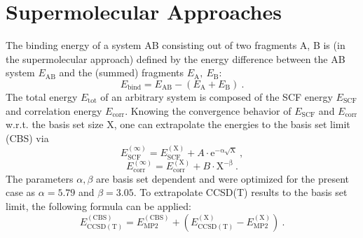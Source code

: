 \documentclass[a4paper,12pt]{scrartcl}
\begin{document}
\section{Supermolecular Approaches}
%
The binding energy  of a system AB consisting out of two fragments A, B is (in the supermolecular approach) defined by the energy difference between the AB system $ E_\mathrm{AB} $ and the (summed) fragments $ E_\mathrm{A},~E_\mathrm{B} $:
%
\begin{equation}
	E_\mathrm{bind} = E_\mathrm{AB} - ( E_\mathrm{A} + E_\mathrm{B} )~.
\end{equation}
%
The total energy $ E_\mathrm{tot} $ of an arbitrary system is composed of the SCF energy $ E_\mathrm{SCF} $ and correlation energy $ E_\mathrm{corr} $. Knowing the convergence behavior of $ E_\mathrm{SCF} $ and $ E_\mathrm{corr} $ w.r.t. the basis set size X, one can extrapolate the energies to the basis set limit (CBS) via
%
\begin{equation}
	E_\mathrm{SCF}^{(\infty)} = E_\mathrm{SCF}^{(\mathrm{X})} + A \cdot \mathrm{e^{-\alpha\sqrt{X}}}~,
\end{equation}
%
\begin{equation}
	E_\mathrm{corr}^{(\infty)} = E_\mathrm{corr}^{(\mathrm{X})}+ B \cdot \mathrm{X^{-\beta}}~.
\end{equation}
%
The parameters $ \alpha,\beta $ are basis set dependent and were optimized for the present case as $ \alpha = 5.79 $ and $ \beta = 3.05 $. To extrapolate CCSD(T) results to the basis set limit, the following formula can be applied:
%
\begin{equation}
	E_\mathrm{CCSD(T)}^\mathrm{(CBS)} = E_\mathrm{MP2}^\mathrm{(CBS)} + ( E_\mathrm{CCSD(T)}^\mathrm{(X)} - E_\mathrm{MP2}^\mathrm{(X)})~.
\end{equation}
%
\end{document}
